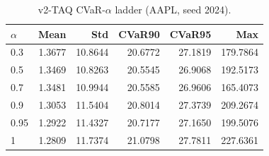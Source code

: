 \begin{table}[H]
    \centering
    \caption{v2-TAQ CVaR-$\alpha$ ladder (AAPL, seed 2024).}
    \label{tab:v2_taq_alpha}
    \begin{tabular}{@{}lrrrrr@{}}
        \toprule
        $\alpha$ & Mean & Std & CVaR90 & CVaR95 & Max \\
        \midrule
        0.3 & 1.3677 & 10.8644 & 20.6772 & 27.1819 & 179.7864 \\
        0.5 & 1.3469 & 10.8263 & 20.5545 & 26.9068 & 192.5173 \\
        0.7 & 1.3481 & 10.9944 & 20.5585 & 26.9606 & 165.4073 \\
        0.9 & 1.3053 & 11.5404 & 20.8014 & 27.3739 & 209.2674 \\
        0.95 & 1.2922 & 11.4327 & 20.7177 & 27.1650 & 199.5076 \\
        1 & 1.2809 & 11.7374 & 21.0798 & 27.7811 & 227.6361 \\
        \bottomrule
    \end{tabular}
\end{table}
